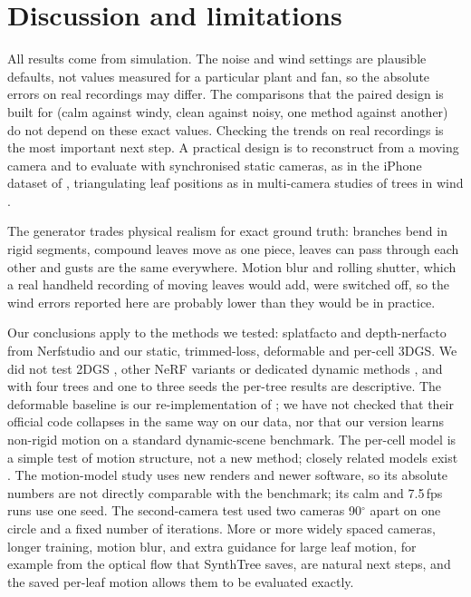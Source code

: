 \documentclass[preprint,11pt,authoryear]{elsarticle}
\begin{document}
\FloatBarrier
\section{Discussion and limitations}\label{sec:discussion}
All results come from simulation. The noise and wind settings are plausible defaults, not values measured for a particular plant and fan, so the absolute errors on real recordings may differ. The comparisons that the paired design is built for (calm against windy, clean against noisy, one method against another) do not depend on these exact values. Checking the trends on real recordings is the most important next step. A practical design is to reconstruct from a moving camera and to evaluate with synchronised static cameras, as in the iPhone dataset of \citet{gao2022monocular}, triangulating leaf positions as in multi-camera studies of trees in wind \citep{kammel2024treestreamlining}.

The generator trades physical realism for exact ground truth: branches bend in rigid segments, compound leaves move as one piece, leaves can pass through each other and gusts are the same everywhere. Motion blur and rolling shutter, which a real handheld recording of moving leaves would add, were switched off, so the wind errors reported here are probably lower than they would be in practice.

Our conclusions apply to the methods we tested: splatfacto and depth-nerfacto from Nerfstudio and our static, trimmed-loss, deformable and per-cell 3DGS. We did not test 2DGS \citep{huang20242dgs}, other NeRF variants or dedicated dynamic methods \citep{wu20244dgs,luiten2024dynamic}, and with four trees and one to three seeds the per-tree results are descriptive. The deformable baseline is our re-implementation of \citet{yang2024deformable}; we have not checked that their official code collapses in the same way on our data, nor that our version learns non-rigid motion on a standard dynamic-scene benchmark. The per-cell model is a simple test of motion structure, not a new method; closely related models exist \citep{wan2024superpoint,huang2024scgs,wang2024shape}. The motion-model study uses new renders and newer software, so its absolute numbers are not directly comparable with the benchmark; its calm and 7.5\,fps runs use one seed. The second-camera test used two cameras 90$^\circ$ apart on one circle and a fixed number of iterations. More or more widely spaced cameras, longer training, motion blur, and extra guidance for large leaf motion, for example from the optical flow that SynthTree saves, are natural next steps, and the saved per-leaf motion allows them to be evaluated exactly.
\end{document}
